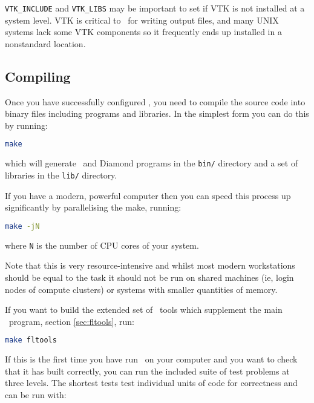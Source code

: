\lstinline[language=Bash]+VTK_INCLUDE+ and \lstinline[language=Bash]+VTK_LIBS+
may be important to set if VTK is not installed at a system level. VTK is
critical to \fluidity\ for writing output files, and many UNIX systems lack some
VTK components so it frequently ends up installed in a nonstandard location.

\subsection{Compiling \fluidity}
\label{sec:compiling_fluidity}

Once you have successfully configured \fluidity, you need to compile the source
code into binary files including programs and libraries. In the simplest form
you can do this by running:

\begin{lstlisting}[language=Bash]
make
\end{lstlisting}

which will generate \fluidity\ and Diamond programs in the
\lstinline[language=Bash]+bin/+ directory and a set of libraries in the
\lstinline[language=Bash]+lib/+ directory. 

If you have a modern, powerful computer then you can speed this process up
significantly by parallelising the make, running:

\begin{lstlisting}[language=Bash]
make -jN
\end{lstlisting}
where \lstinline[language=Bash]+N+ is the number of CPU cores of your system.

Note that this is very resource-intensive and whilst most modern workstations
should be equal to the task it should not be run on shared machines (ie, login
nodes of compute clusters) or systems with smaller quantities of memory.

If you want to build the extended set of \fluidity\ tools which supplement the
main \fluidity\ program, section \ref{sec:fltools}, run:

\begin{lstlisting}[language=Bash]
make fltools
\end{lstlisting}

If this is the first time you have run \fluidity\ on your computer and you want
to check that it has built correctly, you can run the included suite of test
problems at three levels. The shortest tests test individual units of code for
correctness and can be run with:

